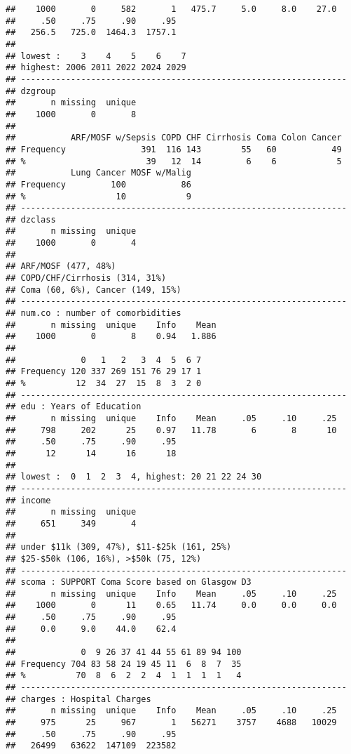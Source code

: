 \documentclass[headinclude=false]{scrartcl}\usepackage[]{graphicx}\usepackage[]{color}
\makeatletter
\newenvironment{kframe}{%
 \def\at@end@of@kframe{}%
 \ifinner\ifhmode%
  \def\at@end@of@kframe{\end{minipage}}%
  \begin{minipage}{\columnwidth}%
 \fi\fi%
 \def\FrameCommand##1{\hskip\@totalleftmargin \hskip-\fboxsep
 \colorbox{shadecolor}{##1}\hskip-\fboxsep
     \hskip-\linewidth \hskip-\@totalleftmargin \hskip\columnwidth}%
 \MakeFramed {\advance\hsize-\width
   \@totalleftmargin\z@ \linewidth\hsize
   \@setminipage}}%
 {\par\unskip\endMakeFramed%
 \at@end@of@kframe}
\newenvironment{knitrout}{}{} %
\makeatother
\begin{document}
\begin{knitrout}
\begin{kframe}
\begin{verbatim}
##    1000       0     582       1   475.7     5.0     8.0    27.0 
##     .50     .75     .90     .95 
##   256.5   725.0  1464.3  1757.1 
## 
## lowest :    3    4    5    6    7
## highest: 2006 2011 2022 2024 2029 
## -----------------------------------------------------------------
## dzgroup 
##       n missing  unique 
##    1000       0       8 
## 
##           ARF/MOSF w/Sepsis COPD CHF Cirrhosis Coma Colon Cancer
## Frequency               391  116 143        55   60           49
## %                        39   12  14         6    6            5
##           Lung Cancer MOSF w/Malig
## Frequency         100           86
## %                  10            9
## -----------------------------------------------------------------
## dzclass 
##       n missing  unique 
##    1000       0       4 
## 
## ARF/MOSF (477, 48%) 
## COPD/CHF/Cirrhosis (314, 31%) 
## Coma (60, 6%), Cancer (149, 15%) 
## -----------------------------------------------------------------
## num.co : number of comorbidities 
##       n missing  unique    Info    Mean 
##    1000       0       8    0.94   1.886 
## 
##             0   1   2   3  4  5  6 7
## Frequency 120 337 269 151 76 29 17 1
## %          12  34  27  15  8  3  2 0
## -----------------------------------------------------------------
## edu : Years of Education 
##       n missing  unique    Info    Mean     .05     .10     .25 
##     798     202      25    0.97   11.78       6       8      10 
##     .50     .75     .90     .95 
##      12      14      16      18 
## 
## lowest :  0  1  2  3  4, highest: 20 21 22 24 30 
## -----------------------------------------------------------------
## income 
##       n missing  unique 
##     651     349       4 
## 
## under $11k (309, 47%), $11-$25k (161, 25%) 
## $25-$50k (106, 16%), >$50k (75, 12%) 
## -----------------------------------------------------------------
## scoma : SUPPORT Coma Score based on Glasgow D3 
##       n missing  unique    Info    Mean     .05     .10     .25 
##    1000       0      11    0.65   11.74     0.0     0.0     0.0 
##     .50     .75     .90     .95 
##     0.0     9.0    44.0    62.4 
## 
##             0  9 26 37 41 44 55 61 89 94 100
## Frequency 704 83 58 24 19 45 11  6  8  7  35
## %          70  8  6  2  2  4  1  1  1  1   4
## -----------------------------------------------------------------
## charges : Hospital Charges 
##       n missing  unique    Info    Mean     .05     .10     .25 
##     975      25     967       1   56271    3757    4688   10029 
##     .50     .75     .90     .95 
##   26499   63622  147109  223582 

\end{verbatim}
\end{kframe}
\end{knitrout}
\end{document}
